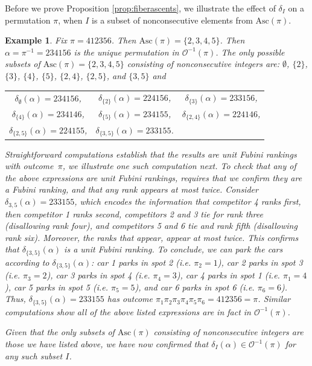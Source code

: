 \documentclass[11pt,reqno]{amsart}
\newcommand{\Asc}{\mathrm{Asc}}
\newcommand{\Out}{\mathcal{O}}
\newtheorem{example}[rethm]{Example}
\begin{document}
Before we prove Proposition \ref{prop:fiberascents}, we illustrate the effect of $\delta_I$ on a permutation $\pi$, when $I$ is a subset of nonconsecutive elements from $\Asc(\pi)$.
\begin{example}
    Fix $\pi = 412356$. Then  $\Asc(\pi) = \{2,3,4,5 \}$. Then $\alpha=\pi^{-1} = 234156$ is the unique permutation in $\Out^{-1}(\pi)$. 
    The only possible subsets of $\Asc(\pi)=\{2,3,4,5\}$ consisting of nonconsecutive integers are: $\emptyset$, $\{2\}$, $\{3\}$, $\{4\}$, $\{5\}$, $\{2,4\}$, $\{2,5\}$, and $\{3,5\}$ and 
    \begin{center}
    \begin{tabular}{ccc}
        $\delta_{\emptyset}(\alpha)=234156$,&
        $\delta_{\{2\}}(\alpha)=224156 $, &
        $\delta_{\{3\}}(\alpha)= 233156$, \\
        $\delta_{\{4\}}(\alpha)=234146$, &
        $\delta_{\{5\}}(\alpha)=234155$, &
        $\delta_{\{2,4\}}(\alpha)=224146$, \\
        $\delta_{\{2,5\}}(\alpha)=224155$, &
        $\delta_{\{3,5\}}(\alpha)=233155$. & 
        \end{tabular}
    \end{center}
        Straightforward computations establish that the results are unit Fubini rankings with outcome~$\pi$, we illustrate one such computation next.
        To check that any of the above expressions are  unit Fubini rankings, requires that we confirm they are a Fubini ranking, and that any rank appears at most twice. Consider $\delta_{3,5}(\alpha)=233155$, which encodes the information that competitor 4 ranks first, then competitor 1 ranks second, competitors 2 and 3 tie for rank three (disallowing rank four), and competitors 5 and 6 tie and rank fifth (disallowing rank six). Moreover, the ranks that appear, appear at most twice. This confirms that $\delta_{\{3,5\}}(\alpha)$ is a unit Fubini ranking. To conclude, we can park the cars according to $\delta_{\{3,5\}}(\alpha)$: car 1 parks in spot 2 (i.e. $\pi_2=1$), car 2 parks in spot 3 (i.e. $\pi_3=2$), car 3 parks in spot 4 (i.e. $\pi_4=3$), car 4 parks in spot 1 (i.e. $\pi_1=4$), car 5 parks in spot 5 (i.e. $\pi_5=5$), and car 6 parks in spot 6 (i.e. $\pi_6=6$). Thus, $\delta_{\{3,5\}}(\alpha)=233155$ has outcome $\pi_1\pi_2\pi_3\pi_4\pi_5\pi_6=412356=\pi$. Similar computations show all of the above listed expressions are in fact in $\Out^{-1}(\pi)$.

Given that the only subsets of $\Asc(\pi)$ consisting of nonconsecutive integers are those we have listed above, we have now confirmed that $\delta_I(\alpha)\in \Out^{-1}(\pi)$ for any such subset $I$. 
\end{example}
\end{document}
